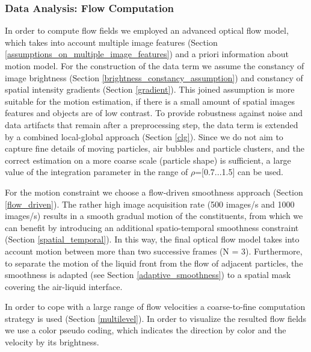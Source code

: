 \subsubsection{Data Analysis: Flow Computation}

In order to compute flow fields we employed an advanced optical flow model, which takes into account multiple image features (Section \ref{assumptions_on_multiple_image_features}) and a priori information about motion model. For the construction of the data term we assume the constancy of image brightness (Section \ref{brightness_constancy_assumption}) and constancy of spatial intensity
gradients (Section \ref{gradient}). This joined assumption is more suitable for the motion estimation, if there is a small amount of spatial images features and objects are of low contrast. To provide robustness against noise and data artifacts that remain after a preprocessing step, the data term is extended by a combined local-global approach (Section \ref{clg}). Since we do not aim to capture fine details of moving particles, air bubbles and particle clusters, and the correct estimation on a more coarse scale (particle shape) is sufficient, a large value of the integration parameter in the range of $\rho$=[0.7...1.5] can be used. 


For the motion constraint we choose a flow-driven smoothness approach (Section \ref{flow_driven}). The rather high image acquisition rate (500 images/s and 1000 images/s) results in a smooth gradual motion of the constituents, from
which we can benefit by introducing an additional spatio-temporal smoothness constraint (Section  \ref{spatial_temporal}). In this way, the final optical flow model takes into account motion between more than two successive frames (N = 3).
Furthermore, to separate the motion of the liquid front from the flow of adjacent particles, the
smoothness is adapted (see Section \ref{adaptive_smoothness}) to a spatial mask covering the air-liquid interface. 

In order to cope with a large range of flow velocities a coarse-to-fine computation strategy is used (Section \ref{multilevel}). In order to visualize the resulted flow fields we use a color pseudo coding, which indicates the direction by color and the velocity by its brightness.


